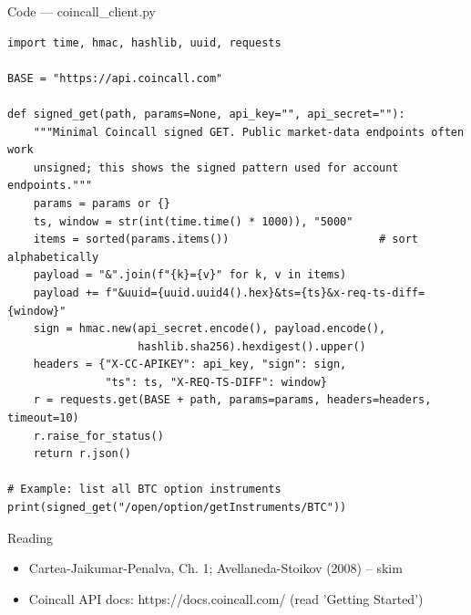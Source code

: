 \documentclass[aspectratio=169,10pt]{beamer}
\begin{document}
\begin{frame}[fragile]{Code --- coincall\_client.py}
\begin{lstlisting}
import time, hmac, hashlib, uuid, requests

BASE = "https://api.coincall.com"

def signed_get(path, params=None, api_key="", api_secret=""):
    """Minimal Coincall signed GET. Public market-data endpoints often work
    unsigned; this shows the signed pattern used for account endpoints."""
    params = params or {}
    ts, window = str(int(time.time() * 1000)), "5000"
    items = sorted(params.items())                       # sort alphabetically
    payload = "&".join(f"{k}={v}" for k, v in items)
    payload += f"&uuid={uuid.uuid4().hex}&ts={ts}&x-req-ts-diff={window}"
    sign = hmac.new(api_secret.encode(), payload.encode(),
                    hashlib.sha256).hexdigest().upper()
    headers = {"X-CC-APIKEY": api_key, "sign": sign,
               "ts": ts, "X-REQ-TS-DIFF": window}
    r = requests.get(BASE + path, params=params, headers=headers, timeout=10)
    r.raise_for_status()
    return r.json()

# Example: list all BTC option instruments
print(signed_get("/open/option/getInstruments/BTC"))
\end{lstlisting}
\end{frame}
\begin{frame}{Reading}
\begin{itemize}
  \item Cartea-Jaikumar-Penalva, Ch. 1; Avellaneda-Stoikov (2008) -- skim
  \item Coincall API docs: https://docs.coincall.com/  (read 'Getting Started')
\end{itemize}
\end{frame}
\end{document}
